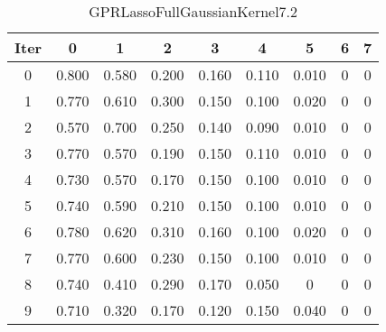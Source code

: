 \begin{table}
	\begin{center}
		\begin{tabular}{|c|c|c|c|c|c|c|c|c|}
			\hline
			Iter & 0 & 1 & 2 & 3 & 4 & 5 & 6 & 7 \\
			\hline
			0 & 0.800 & 0.580 & 0.200 & 0.160 & 0.110 & 0.010 & 0 & 0 \\
			\hline
			1 & 0.770 & 0.610 & 0.300 & 0.150 & 0.100 & 0.020 & 0 & 0 \\
			\hline
			2 & 0.570 & 0.700 & 0.250 & 0.140 & 0.090 & 0.010 & 0 & 0 \\
			\hline
			3 & 0.770 & 0.570 & 0.190 & 0.150 & 0.110 & 0.010 & 0 & 0 \\
			\hline
			4 & 0.730 & 0.570 & 0.170 & 0.150 & 0.100 & 0.010 & 0 & 0 \\
			\hline
			5 & 0.740 & 0.590 & 0.210 & 0.150 & 0.100 & 0.010 & 0 & 0 \\
			\hline
			6 & 0.780 & 0.620 & 0.310 & 0.160 & 0.100 & 0.020 & 0 & 0 \\
			\hline
			7 & 0.770 & 0.600 & 0.230 & 0.150 & 0.100 & 0.010 & 0 & 0 \\
			\hline
			8 & 0.740 & 0.410 & 0.290 & 0.170 & 0.050 & 0 & 0 & 0 \\
			\hline
			9 & 0.710 & 0.320 & 0.170 & 0.120 & 0.150 & 0.040 & 0 & 0 \\
			\hline
		\end{tabular}
	\end{center}
	\caption{GPRLassoFullGaussianKernel7.2}
\end{table}
